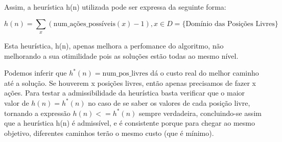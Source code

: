 \documentclass[12pt,a4paper]{article}
\begin{document}
  Assim, a heurística h(n) utilizada pode ser expressa da seguinte forma:
  
  $$
  h(n) = \sum_x {(\text{num\_ações\_possíveis}(x) -1)} , x \in D = \{\text{Domínio das Posições Livres}\}
  $$

  
  Esta heurística, h(n), apenas melhora a perfomance do algoritmo, não melhorando a sua otimilidade pois as soluções estão todas ao mesmo nível.

  Podemos inferir que $h^*(n) = \text{num\_pos\_livres}$ dá o custo real do melhor caminho até a solução. Se houverem x posições livres, então apenas precisamos de fazer x ações.
  Para testar a admissibilidade da heurística basta verificar que o maior valor de $h(n) = h^*(n)$ no caso de se saber os valores de cada posição livre, tornando a expressão $h(n) <= h^*(n)$ sempre verdadeira,
  concluindo-se assim que a heurística h(n) é admissível, e é consistente porque para chegar ao mesmo objetivo, diferentes caminhos terão o mesmo custo (que é mínimo).
\end{document}
